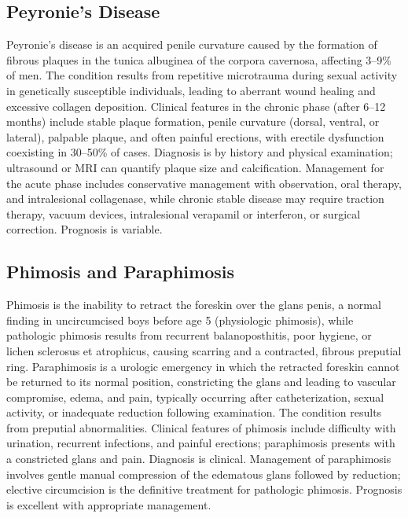 \subsection{Peyronie's Disease}
\label{sec:Peyronie's Disease}
Peyronie's disease is an acquired penile curvature caused by the formation of fibrous plaques in the tunica albuginea of the corpora cavernosa, affecting 3--9\% of men. The condition results from repetitive microtrauma during sexual activity in genetically susceptible individuals, leading to aberrant wound healing and excessive collagen deposition. Clinical features in the chronic phase (after 6--12 months) include stable plaque formation, penile curvature (dorsal, ventral, or lateral), palpable plaque, and often painful erections, with erectile dysfunction coexisting in 30--50\% of cases. Diagnosis is by history and physical examination; ultrasound or MRI can quantify plaque size and calcification. Management for the acute phase includes conservative management with observation, oral therapy, and intralesional collagenase, while chronic stable disease may require traction therapy, vacuum devices, intralesional verapamil or interferon, or surgical correction. Prognosis is variable.

\subsection{Phimosis and Paraphimosis}
\label{sec:Phimosis and Paraphimosis}
Phimosis is the inability to retract the foreskin over the glans penis, a normal finding in uncircumcised boys before age 5 (physiologic phimosis), while pathologic phimosis results from recurrent balanoposthitis, poor hygiene, or lichen sclerosus et atrophicus, causing scarring and a contracted, fibrous preputial ring. Paraphimosis is a urologic emergency in which the retracted foreskin cannot be returned to its normal position, constricting the glans and leading to vascular compromise, edema, and pain, typically occurring after catheterization, sexual activity, or inadequate reduction following examination. The condition results from preputial abnormalities. Clinical features of phimosis include difficulty with urination, recurrent infections, and painful erections; paraphimosis presents with a constricted glans and pain. Diagnosis is clinical. Management of paraphimosis involves gentle manual compression of the edematous glans followed by reduction; elective circumcision is the definitive treatment for pathologic phimosis. Prognosis is excellent with appropriate management.

